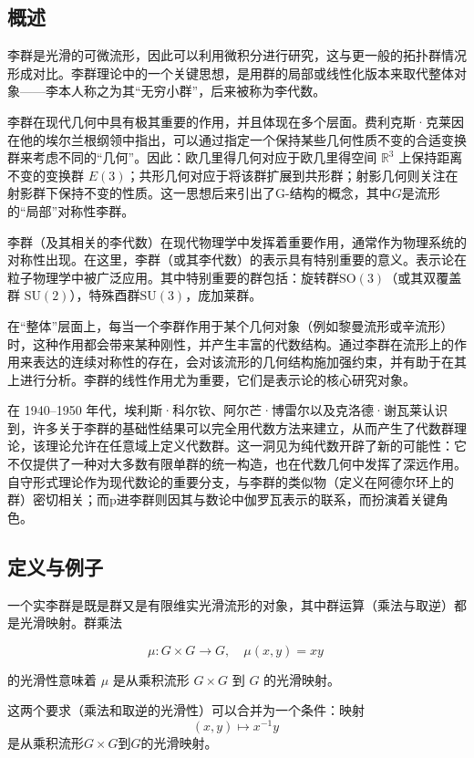 \subsection{概述}
李群是光滑的可微流形，因此可以利用微积分进行研究，这与更一般的拓扑群情况形成对比。李群理论中的一个关键思想，是用群的局部或线性化版本来取代整体对象——李本人称之为其“无穷小群”，后来被称为李代数。

李群在现代几何中具有极其重要的作用，并且体现在多个层面。费利克斯·克莱因在他的埃尔兰根纲领中指出，可以通过指定一个保持某些几何性质不变的合适变换群来考虑不同的“几何”。因此：欧几里得几何对应于欧几里得空间 $\mathbb{R}^3$ 上保持距离不变的变换群 $E(3)$；共形几何对应于将该群扩展到共形群；射影几何则关注在射影群下保持不变的性质。这一思想后来引出了G-结构的概念，其中$G$是流形的“局部”对称性李群。

李群（及其相关的李代数）在现代物理学中发挥着重要作用，通常作为物理系统的对称性出现。在这里，李群（或其李代数）的表示具有特别重要的意义。表示论在粒子物理学中被广泛应用。其中特别重要的群包括：旋转群$\mathrm{SO}(3)$（或其双覆盖群 $\mathrm{SU}(2)$），特殊酉群$\mathrm{SU}(3)$，庞加莱群。

在“整体”层面上，每当一个李群作用于某个几何对象（例如黎曼流形或辛流形）时，这种作用都会带来某种刚性，并产生丰富的代数结构。通过李群在流形上的作用来表达的连续对称性的存在，会对该流形的几何结构施加强约束，并有助于在其上进行分析。李群的线性作用尤为重要，它们是表示论的核心研究对象。

在 1940–1950 年代，埃利斯·科尔钦、阿尔芒·博雷尔以及克洛德·谢瓦莱认识到，许多关于李群的基础性结果可以完全用代数方法来建立，从而产生了代数群理论，该理论允许在任意域上定义代数群。这一洞见为纯代数开辟了新的可能性：它不仅提供了一种对大多数有限单群的统一构造，也在代数几何中发挥了深远作用。自守形式理论作为现代数论的重要分支，与李群的类似物（定义在阿德尔环上的群）密切相关；而p进李群则因其与数论中伽罗瓦表示的联系，而扮演着关键角色。
\subsection{定义与例子}
一个实李群是既是群又是有限维实光滑流形的对象，其中群运算（乘法与取逆）都是光滑映射。群乘法

$$
\mu : G \times G \to G, \quad \mu(x,y) = xy~
$$

的光滑性意味着 $\mu$ 是从乘积流形 $G \times G$ 到 $G$ 的光滑映射。

这两个要求（乘法和取逆的光滑性）可以合并为一个条件：映射
$$
(x,y) \mapsto x^{-1}y~
$$
是从乘积流形$G \times G$到$G$的光滑映射。
